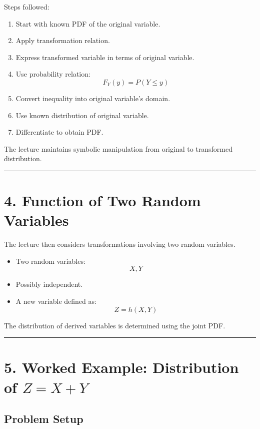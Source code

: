 \documentclass[11pt]{article}
\begin{document}
Steps followed:

\begin{enumerate}
    \item Start with known PDF of the original variable.
    \item Apply transformation relation.
    \item Express transformed variable in terms of original variable.
    \item Use probability relation:
    \[
    F_Y(y) = P(Y \le y)
    \]
    \item Convert inequality into original variable’s domain.
    \item Use known distribution of original variable.
    \item Differentiate to obtain PDF.
\end{enumerate}

The lecture maintains symbolic manipulation from original to transformed distribution.

\hrule
\vspace{0.5em}

\section*{4. Function of Two Random Variables}

The lecture then considers transformations involving two random variables.

\begin{itemize}
    \item Two random variables:
    \[
    X, Y
    \]
    \item Possibly independent.
    \item A new variable defined as:
    \[
    Z = h(X, Y)
    \]
\end{itemize}

The distribution of derived variables is determined using the joint PDF.

\hrule
\vspace{0.5em}

\section*{5. Worked Example: Distribution of \(Z = X + Y\)}

\subsection*{Problem Setup}
\end{document}

